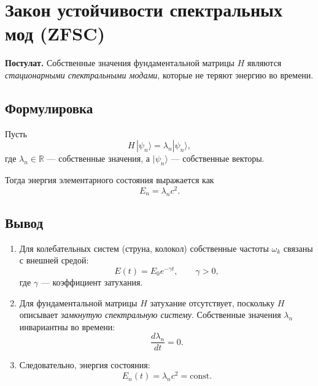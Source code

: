 \documentclass[12pt,a4paper]{article}
\begin{document}
\begin{center}
\end{center}

\section*{Закон устойчивости спектральных мод (ZFSC)}

\textbf{Постулат.} 
Собственные значения фундаментальной матрицы $H$ являются 
\emph{стационарными спектральными модами}, которые не теряют энергию во времени.  

\subsection*{Формулировка}
Пусть 
\[
H \, |\psi_n\rangle = \lambda_n |\psi_n\rangle ,
\]
где $\lambda_n \in \mathbb{R}$ --- собственные значения, а $|\psi_n\rangle$ --- собственные векторы.

Тогда энергия элементарного состояния выражается как
\[
E_n = \lambda_n c^2 .
\]

\subsection*{Вывод}
\begin{enumerate}
  \item Для колебательных систем (струна, колокол) собственные частоты $\omega_k$ связаны с внешней средой: 
  \[
  E(t) = E_0 e^{-\gamma t}, \qquad \gamma > 0,
  \]
  где $\gamma$ --- коэффициент затухания.
  
  \item Для фундаментальной матрицы $H$ затухание отсутствует, поскольку $H$ описывает \emph{замкнутую спектральную систему}.  
  Собственные значения $\lambda_n$ инвариантны во времени:
  \[
  \frac{d\lambda_n}{dt} = 0.
  \]
  
  \item Следовательно, энергия состояния:
  \[
  E_n(t) = \lambda_n c^2 = \text{const}.
  \]
\end{enumerate}
\end{document}
